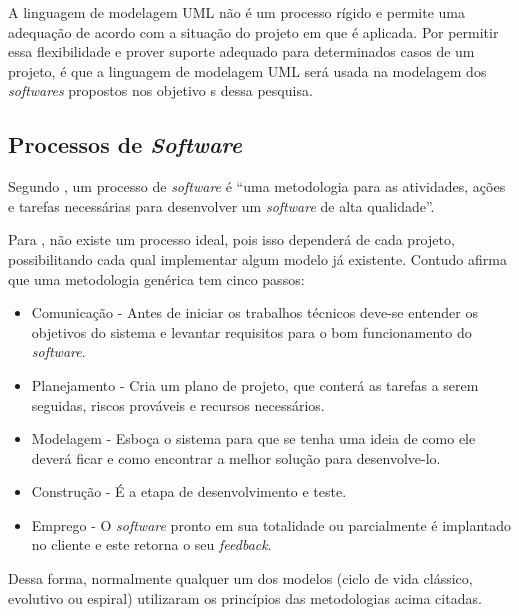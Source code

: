 		\pagebreak
		\par A linguagem de modelagem UML não é um processo rígido e permite uma
		adequação de acordo com a situação do projeto em que é aplicada. Por permitir
		essa flexibilidade e prover suporte adequado para determinados casos de um
		projeto, é que a linguagem de modelagem UML será usada na modelagem dos
		\textit{softwares} propostos nos objetivo s dessa pesquisa.

	
	\subsection{Processos de \textit{Software}}
	
	
	\par Segundo , um processo de \textit{software} é
“uma metodologia para as atividades, ações e tarefas necessárias para
desenvolver um \textit{software} de alta qualidade”.

	\par Para , não existe um processo ideal, pois isso
dependerá de cada projeto, possibilitando cada qual implementar algum modelo já
existente. Contudo  afirma que uma metodologia
genérica tem cinco passos:
	\begin{itemize}
	  
	  \item Comunicação - Antes de iniciar os trabalhos técnicos deve-se entender
	  os objetivos do sistema e levantar requisitos para o bom funcionamento do
	  \textit{software}.
	  
	  \item Planejamento - Cria um plano de projeto, que conterá as tarefas a
	  serem seguidas, riscos prováveis e recursos necessários.
	  
	  \item Modelagem - Esboça o sistema para que se tenha uma ideia de como ele
	  deverá ficar e como encontrar a melhor solução para desenvolve-lo.
	  
	  \item Construção - É a etapa de desenvolvimento e teste.
	  
	  \item Emprego - O \textit{software} pronto em sua totalidade ou parcialmente
	  é implantado no cliente e este retorna o seu \textit{feedback}.
	 
	 \end{itemize}
	 
	 \par Dessa forma, normalmente qualquer um dos modelos (ciclo de vida clássico,
evolutivo ou espiral) utilizaram os princípios das metodologias acima citadas.
	
